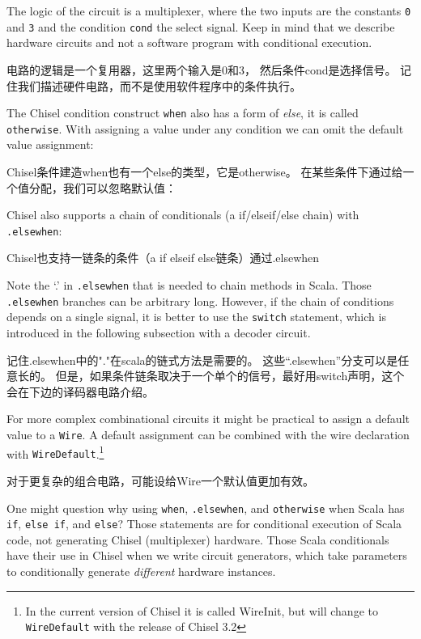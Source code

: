 \documentclass[%
    10pt,
    headinclude, footexclude,
    openright, %
    notitlepage,
    cleardoubleempty,
    headsepline,
    pointlessnumbers,
    bibtotoc, idxtotoc,
    ]{scrbook}
\newcommand{\code}[1]{{\small{\texttt{#1}}}}
\begin{document}

\noindent The logic of the circuit is a multiplexer, where the two inputs are the constants
\code{0} and \code{3} and the condition \code{cond} the select signal.
Keep in mind that we describe hardware circuits and not a software program with conditional
execution.

电路的逻辑是一个复用器，这里两个输入是0和3， 然后条件cond是选择信号。
记住我们描述硬件电路，而不是使用软件程序中的条件执行。

The Chisel condition construct \code{when} also has a form of \emph{else}, it is called
\code{otherwise}. With assigning a value under any condition we can omit the default
value assignment:

Chisel条件建造when也有一个else的类型，它是otherwise。
在某些条件下通过给一个值分配，我们可以忽略默认值：


Chisel also supports a chain of conditionals (a if/elseif/else chain) with \code{.elsewhen}:

Chisel也支持一链条的条件（a if elseif else链条）通过.elsewhen


Note the `.' in \code{.elsewhen} that is needed to chain methods in Scala.
Those \code{.elsewhen} branches can be arbitrary long.
However, if the chain of conditions depends on a single signal, it is better
to use the \code{switch} statement, which is introduced in the following
subsection with a decoder circuit.

记住.elsewhen中的"."在scala的链式方法是需要的。
这些“.elsewhen”分支可以是任意长的。
但是，如果条件链条取决于一个单个的信号，最好用switch声明，这个会在下边的译码器电路介绍。

For more complex combinational circuits it might be practical to assign
a default value to a \code{Wire}. A default assignment can be combined with the wire
declaration with \code{WireDefault}.\footnote{In the current version of Chisel
it is called WireInit, but will change to \code{WireDefault} with the release of Chisel 3.2}

对于更复杂的组合电路，可能设给Wire一个默认值更加有效。


One might question why using \code{when}, \code{.elsewhen}, and \code{otherwise}
when Scala has \code{if}, \code{else if}, and \code{else}? Those statements are for
conditional execution of Scala code, not generating Chisel (multiplexer) hardware.
Those Scala conditionals have their use in Chisel when we write circuit generators,
which take parameters to conditionally generate \emph{different} hardware instances.
\end{document}
